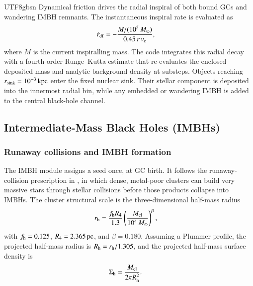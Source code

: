 \documentclass[trackchanges, twocolappendix, twocolumn]{aastex701}
\begin{document}
\begin{CJK*}{UTF8}{gbsn}
Dynamical friction drives the radial inspiral of both bound GCs and wandering IMBH remnants. The instantaneous inspiral rate is evaluated as
\begin{align}
\dot{r}_{\rm df} & = - \dfrac{M / (10^5\,M_\odot)}{0.45\,r\,v_{\rm c}},
\label{eq:dynamical_friction}
\end{align}
where $M$ is the current inspiralling mass. The code integrates this radial decay with a fourth-order Runge--Kutta estimate that re-evaluates the enclosed deposited mass and analytic background density at substeps. Objects reaching $r_{\rm sink} = 10^{-3}\,{\rm kpc}$ enter the fixed nuclear sink. Their stellar component is deposited into the innermost radial bin, while any embedded or wandering IMBH is added to the central black-hole channel.

\subsection{Intermediate-Mass Black Holes (IMBHs)} \label{subsect:IMBH}

\subsubsection{Runaway collisions and IMBH formation} \label{subsubsect:runaway_imbh}

The IMBH module assigns a seed once, at GC birth. It follows the runaway-collision prescription in \cite{Rantala+2026FROST}, in which dense, metal-poor clusters can build very massive stars through stellar collisions before those products collapse into IMBHs. The cluster structural scale is the three-dimensional half-mass radius
\begin{align}
r_{\rm h} & =
\dfrac{f_{\rm h} R_4}{1.3}
\left(\dfrac{M_{\rm cl}}{10^4\,M_\odot}\right)^{\beta},
\label{eq:imbh_radius}
\end{align}
with $f_{\rm h} = 0.125$, $R_4 = 2.365\,{\rm pc}$, and $\beta = 0.180$. Assuming a Plummer profile, the projected half-mass radius is $R_{\rm h} = r_{\rm h} / 1.305$, and the projected half-mass surface density is
\begin{align}
\Sigma_{\rm h} & = \dfrac{M_{\rm cl}}{2 \pi R_{\rm h}^2}.
\label{eq:imbh_sigma}
\end{align}


\end{CJK*}
\end{document}
